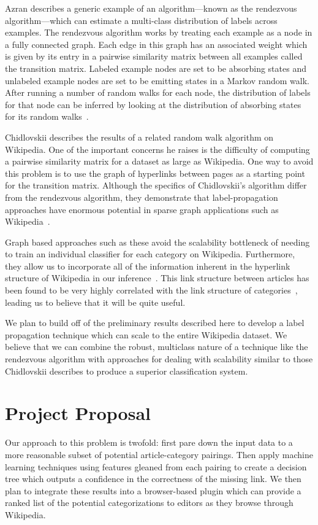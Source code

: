 \documentclass{sig-alternate}
\begin{document}
Azran describes a generic example of an algorithm---known as the rendezvous algorithm---which can estimate a multi-class distribution of labels across examples. The rendezvous algorithm works by treating each example as a node in a fully connected graph. Each edge in this graph has an associated weight which is given by its entry in a pairwise similarity matrix between all examples called the transition matrix. Labeled example nodes are set to be absorbing states and unlabeled example nodes are set to be emitting states in a Markov random walk. After running a number of random walks for each node, the distribution of labels for that node can be inferred by looking at the distribution of absorbing states for its random walks~\cite{Azran}.

Chidlovskii describes the results of a related random walk algorithm on Wikipedia. One of the important concerns he raises is the difficulty of computing a pairwise similarity matrix for a dataset as large as Wikipedia. One way to avoid this problem is to use the graph of hyperlinks between pages as a starting point for the transition matrix. Although the specifics of Chidlovskii's algorithm differ from the rendezvous algorithm, they demonstrate that label-propagation approaches have enormous potential in sparse graph applications such as Wikipedia~\cite{Chidlovskii}.

Graph based approaches such as these avoid the scalability bottleneck of needing to train an individual classifier for each category on Wikipedia. Furthermore, they allow us to incorporate all of the information inherent in the hyperlink structure of Wikipedia in our inference~\cite{Avrachenkov}. This link structure between articles has been found to be very highly correlated with the link structure of categories~\cite{Ponzetto, Holloway}, leading us to believe that it will be quite useful.

We plan to build off of the preliminary results described here to develop a label propagation technique which can scale to the entire Wikipedia dataset. We believe that we can combine the robust, multiclass nature of a technique like the rendezvous algorithm with approaches for dealing with scalability similar to those Chidlovskii describes to produce a superior classification system.

\section{Project Proposal}
\label{sec:project_proposal}
Our approach to this problem is twofold: first pare down the input data to a more reasonable subset of potential article-category pairings. Then apply machine learning techniques using features gleaned from each pairing to create a decision tree which outputs a confidence in the correctness of the missing link. We then plan to integrate these results into a browser-based plugin which can provide a ranked list of the potential categorizations to editors as they browse through Wikipedia.
\end{document}
